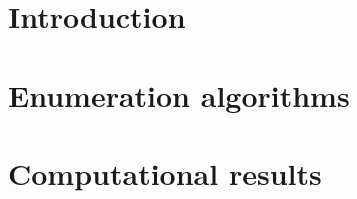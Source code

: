 \documentclass{report}
\author{Zofia Glapa}
\date{\today{}}
\begin{document}

\pagebreak

\listoftheorems[ignoreall,show={defn}]
\renewcommand{\listtheoremname}{List of algorithms}
\makeatletter
\renewcommand\thmt@listnumwidth{2.6em}
\makeatother
\listoftheorems[ignoreall,show={alg}]
\tableofcontents

\pagebreak

\chapter{Introduction}

\chapter{Enumeration algorithms}

\chapter{Computational results}


\printbibliography
\end{document}

